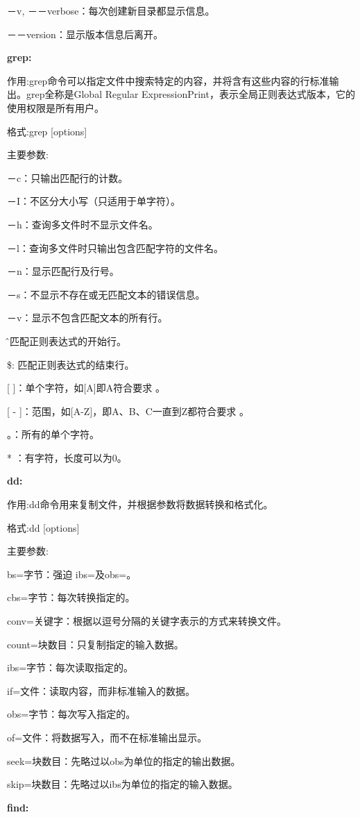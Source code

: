 －v, －－verbose：每次创建新目录都显示信息。

－－version：显示版本信息后离开。

\textbf{grep:}

作用:grep命令可以指定文件中搜索特定的内容，并将含有这些内容的行标准输出。grep全称是Global Regular ExpressionPrint，表示全局正则表达式版本，它的使用权限是所有用户。

格式:grep [options]

主要参数:

－c：只输出匹配行的计数。

－I：不区分大小写（只适用于单字符）。

－h：查询多文件时不显示文件名。

－l：查询多文件时只输出包含匹配字符的文件名。

－n：显示匹配行及行号。

－s：不显示不存在或无匹配文本的错误信息。

－v：显示不包含匹配文本的所有行。

\^：匹配正则表达式的开始行。

\$: 匹配正则表达式的结束行。

[ ]：单个字符，如[A]即A符合要求 。

[ - ]：范围，如[A-Z]，即A、B、C一直到Z都符合要求 。

。：所有的单个字符。

* ：有字符，长度可以为0。

\textbf{dd:}

作用:dd命令用来复制文件，并根据参数将数据转换和格式化。

格式:dd [options]

主要参数:

bs=字节：强迫 ibs=及obs=。

cbs=字节：每次转换指定的。

conv=关键字：根据以逗号分隔的关键字表示的方式来转换文件。

count=块数目：只复制指定的输入数据。

ibs=字节：每次读取指定的。

if=文件：读取内容，而非标准输入的数据。

obs=字节：每次写入指定的。

of=文件：将数据写入，而不在标准输出显示。

seek=块数目：先略过以obs为单位的指定的输出数据。

skip=块数目：先略过以ibs为单位的指定的输入数据。

\textbf{find:}


